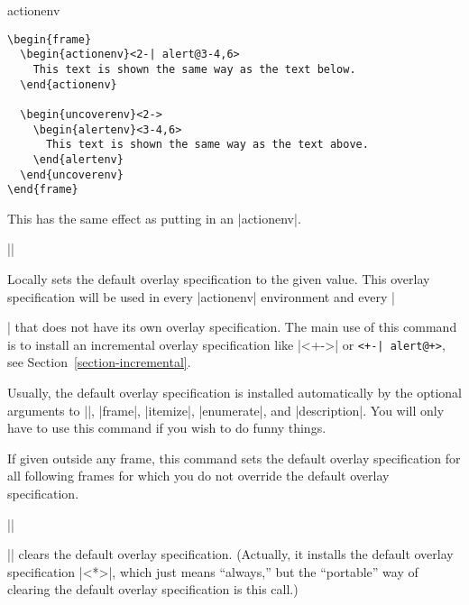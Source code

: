 \begin{original...}
\begin{environment}{{actionenv}}
  \example
\begin{verbatim}
\begin{frame}
  \begin{actionenv}<2-| alert@3-4,6>
    This text is shown the same way as the text below.
  \end{actionenv}

  \begin{uncoverenv}<2->
    \begin{alertenv}<3-4,6>
      This text is shown the same way as the text above.
    \end{alertenv}
  \end{uncoverenv}
\end{frame}
\end{verbatim}
\end{environment}

\begin{command}{\action{}}
  This has the same effect as putting  in an |actionenv|.

  \example
  ||
\end{command}

\begin{command}{\beamerdefaultoverlayspecification{}}
  Locally sets the default overlay specification to the given value. This overlay specification will be used in every |actionenv| environment and every |\item| that does not have its own overlay specification. The main use of this command is to install an incremental overlay specification like |<+->| or \verb/<+-| alert@+>/, see Section~\ref{section-incremental}.

  Usually, the default overlay specification is installed automatically by the optional arguments to |\frame|, |frame|, |itemize|, |enumerate|, and |description|. You will only have to use this command if you wish to do funny things.

  If given outside any frame, this command sets the default overlay specification for all following frames for which you do not override the default overlay specification.

  \example
  |\beamerdefaultoverlayspecification{<+->}|

  \example
  |\beamerdefaultoverlayspecification{}| clears the default overlay specification. (Actually, it installs the default overlay specification |<*>|, which just means ``always,'' but the ``portable'' way of clearing the default overlay specification is this call.)
\end{command}


\end{original...}
